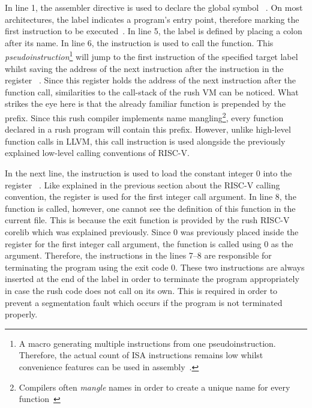 In line 1, the  assembler directive is used to declare the global symbol ~\cite[p~.36]{Patterson2017}.
On most architectures, the  label indicates a program's entry point, therefore marking the first instruction to be executed~\cite[p.~19]{Zhirkov2017-wk}.
In line 5, the  label is defined by placing a colon after its name.
In line 6, the  instruction is used to call the  function.
This \emph{pseudoinstruction}\footnote{A macro generating multiple instructions from one pseudoinstruction. Therefore, the actual count of ISA instructions remains low whilst convenience features can be used in assembly~\cite[p.~68]{Dandamudi2005}.} will jump to the first instruction of the specified target label whilst saving the address of the next instruction after the  instruction in the register ~\cite[p.~22]{Patterson2017}.
Since this register holds the address of the next instruction after the function call, similarities to the call-stack of the rush VM can be noticed.
What strikes the eye here is that the already familiar  function is prepended by the  prefix.
Since this rush compiler implements name mangling\footnote{Compilers often \emph{mangle} names in order to create a unique name for every function~\cite[pp.~119-120]{Levine2000}},
every function declared in a rush program will contain this prefix.
However, unlike high-level function calls in LLVM, this call instruction is used alongside the previously explained low-level calling conventions of RISC-V.

In the next line, the  instruction is used to load the constant integer 0 into the register ~\cite[reference]{Patterson2017}.
Like explained in the previous section about the RISC-V calling convention,
the register  is used for the first integer call argument.
In line 8, the  function is called, however, one cannot see the definition of this function in the current file.
This is because the exit function is provided by the rush RISC-V corelib which was explained previously.
Since 0 was previously placed inside the register for the first integer call argument, the  function is called using 0 as the argument.
Therefore, the instructions in the lines 7--8 are responsible for terminating the program using the exit code 0.
These two instructions are always inserted at the end of the  label in order to terminate the program appropriately in case the rush code does not call  on its own.
This is required in order to prevent a segmentation fault which occurs if the program is not terminated properly.

